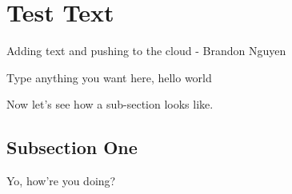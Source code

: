 
\section{Test Text}
\label{sec:text}

Adding text and pushing to the cloud - Brandon Nguyen

Type anything you want here, hello world

Now let's see how a sub-section looks like.

\subsection{Subsection One}

Yo, how're you doing?



 

